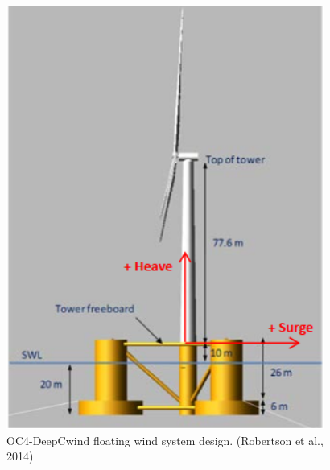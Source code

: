 \documentclass[a4paper]{article}
\begin{document}
\begin{figure}[htbp]
    \begin{minipage}{0.47\textwidth}
        \centering
        \includegraphics[width=0.93\textwidth]{OC4.png}
        \caption{\small OC4-DeepCwind floating wind system design. (Robertson et al., 2014)}
        \label{fig:OC4}
    \end{minipage}
    \hfill
    \begin{minipage}{0.5\textwidth}
        \centering

\end{minipage}
\end{figure}
\end{document}
